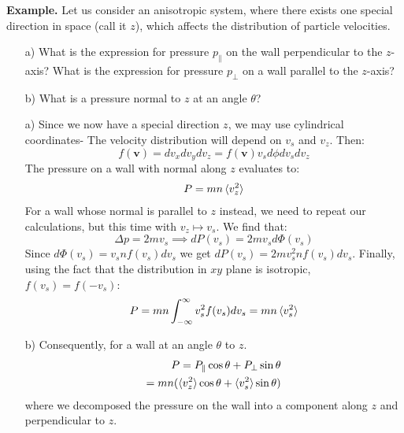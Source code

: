 \documentclass[a4paper,11pt,oneside]{book}
\newcommand{\BF}[1]{\boldsymbol{#1}}
\begin{document}
\begin{strategy}
\sffamily  \textbf{Example.} Let us consider an anisotropic system, where there exists one special direction in space (call it $z$), which affects the distribution of particle velocities. 
\begin{enumerate}
    \item[a)] What is the expression for pressure $p_{\parallel}$ on the wall perpendicular to the $z$-axis? What is the expression for pressure $p_{\perp}$ on a wall parallel to the $z$-axis? 
    \item[b)] What is a pressure normal to $z$ at an angle $\theta$? 
\end{enumerate}
\end{strategy}
\begin{mdframed}
\begin{solution}
\begin{enumerate}
    \item[a)] Since we now have a special direction $z$, we may use cylindrical coordinates- The velocity distribution will depend on $v_s$ and $v_z$. Then:
    \begin{equation}
        f(\BF{v}) = dv_x dv_y dv_z = f(\BF{v}) v_s d\phi dv_s dv_z
    \end{equation}
    The pressure on a wall with normal along $z$ evaluates to:
    \begin{align}
        P = mn \braket{v_z^2}
    \end{align}
    For a wall whose normal is parallel to $z$ instead, we need to repeat our calculations, but this time with $v_z \mapsto v_s$. We find that:
    \begin{equation}
        \Delta p = 2mv_s \implies dP(v_s) = 2mv_s d\Phi(v_s)
    \end{equation}
    Since $d\Phi(v_s) = v_s n f(v_s) dv_s$ we get $dP(v_s) = 2mv_s^2 nf(v_s) dv_s$. Finally, using the fact that the distribution in $xy$ plane is isotropic, $f(v_s)=f(-v_s)$:
    \begin{equation}
           P=mn \int_{-\infty}^\infty v_s^2 f(v_s) dv_s = mn \braket{v_s^2}
    \end{equation}
   \item[b)] Consequently, for a wall at an angle $\theta$ to $z$.
    \begin{align}
        P = P_{\parallel} \cos \theta + P_\perp \sin \theta \\
        = mn(\braket{v_z^2} \cos \theta + \braket{v_s^2} \sin \theta)
    \end{align}
    where we decomposed the pressure on the wall into a component along $z$ and perpendicular to $z$.
\end{enumerate}
\end{solution}
\end{mdframed}
\end{document}
